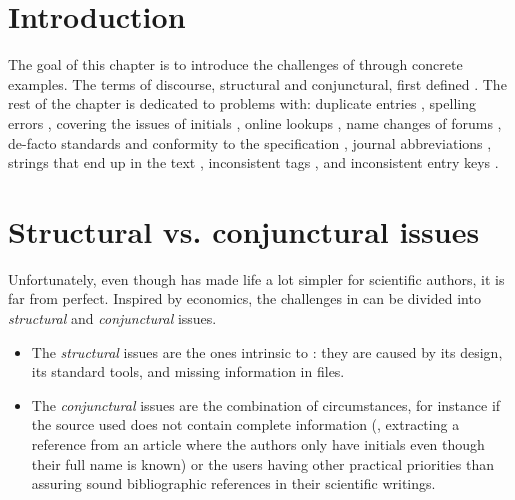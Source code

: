 
\section{Introduction}
The goal of this chapter is to introduce the challenges of {\bibtex}
through concrete examples.  The terms of discourse, structural and
conjunctural, first defined
.  The rest of the
chapter is dedicated to problems with: duplicate entries
, spelling errors
, covering the issues of initials
, online lookups
, name changes of forums
, de-facto standards and conformity
to the {\bibtex} specification ,
journal abbreviations , {\bibtex}
strings that end up in the text
, inconsistent tags
, and inconsistent entry keys
 .

\section{Structural vs. conjunctural issues}
\label{sec:problems_structural_conjunctural}

Unfortunately, even though {\bibtex} has made life a lot simpler for
scientific authors, it is far from perfect.  Inspired by economics,
the challenges in {\bibtex} can be divided into \emph{structural} and
\emph{conjunctural} issues.

\begin{itemize}
\item The \emph{structural} issues are the ones intrinsic to
  {\bibtex}: they are caused by its design, its standard tools, and
  missing information in {\bibtex} files.

\item The \emph{conjunctural} issues are the combination of
  circumstances, for instance if the source used does not contain
  complete information (\eg, extracting a reference from an article
  where the authors only have initials even though their full name is
  known) or the users having other practical priorities than assuring
  sound bibliographic references in their scientific writings.
\end{itemize}

